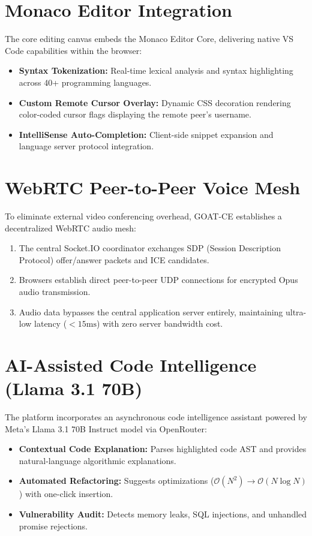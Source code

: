 \documentclass[12pt,a4paper]{report}
\begin{document}
\section{Monaco Editor Integration}
The core editing canvas embeds the Monaco Editor Core, delivering native VS Code capabilities within the browser:
\begin{itemize}
    \item \textbf{Syntax Tokenization:} Real-time lexical analysis and syntax highlighting across 40+ programming languages.
    \item \textbf{Custom Remote Cursor Overlay:} Dynamic CSS decoration rendering color-coded cursor flags displaying the remote peer's username.
    \item \textbf{IntelliSense Auto-Completion:} Client-side snippet expansion and language server protocol integration.
\end{itemize}

\section{WebRTC Peer-to-Peer Voice Mesh}
To eliminate external video conferencing overhead, GOAT-CE establishes a decentralized WebRTC audio mesh:
\begin{enumerate}
    \item The central Socket.IO coordinator exchanges SDP (Session Description Protocol) offer/answer packets and ICE candidates.
    \item Browsers establish direct peer-to-peer UDP connections for encrypted Opus audio transmission.
    \item Audio data bypasses the central application server entirely, maintaining ultra-low latency ($< 15\text{ms}$) with zero server bandwidth cost.
\end{enumerate}

\section{AI-Assisted Code Intelligence (Llama 3.1 70B)}
The platform incorporates an asynchronous code intelligence assistant powered by Meta's Llama 3.1 70B Instruct model via OpenRouter:
\begin{itemize}
    \item \textbf{Contextual Code Explanation:} Parses highlighted code AST and provides natural-language algorithmic explanations.
    \item \textbf{Automated Refactoring:} Suggests optimizations ($\mathcal{O}(N^2) \to \mathcal{O}(N \log N)$) with one-click insertion.
    \item \textbf{Vulnerability Audit:} Detects memory leaks, SQL injections, and unhandled promise rejections.
\end{itemize}
\end{document}
